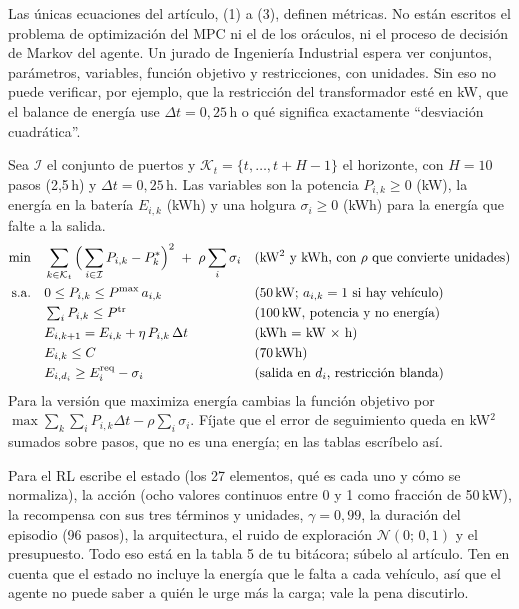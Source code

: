 \documentclass[11pt]{article}
\begin{document}
\begin{error}
Las únicas ecuaciones del artículo, (1) a (3), definen métricas. No están escritos el problema de optimización del MPC ni el de los oráculos, ni el proceso de decisión de Markov del agente. Un jurado de Ingeniería Industrial espera ver conjuntos, parámetros, variables, función objetivo y restricciones, con unidades. Sin eso no puede verificar, por ejemplo, que la restricción del transformador esté en kW, que el balance de energía use $\Delta t = 0{,}25$\,h o qué significa exactamente ``desviación cuadrática''.
\end{error}

\begin{ejemplo}
Sea $\mathcal{I}$ el conjunto de puertos y $\mathcal{K}_t = \{t,\dots,t+H-1\}$ el horizonte, con $H = 10$ pasos (2,5\,h) y $\Delta t = 0{,}25$\,h. Las variables son la potencia $P_{i,k} \ge 0$ (kW), la energía en la batería $E_{i,k}$ (kWh) y una holgura $\sigma_i \ge 0$ (kWh) para la energía que falte a la salida.
\begin{align*}
\min \quad & \sum_{k \in \mathcal{K}_t} \Big(\sum_{i \in \mathcal{I}} P_{i,k} - P^{\ast}_{k}\Big)^{2} \;+\; \rho \sum_{i} \sigma_i
  && \text{(kW$^2$ y kWh, con $\rho$ que convierte unidades)}\\
\text{s.a.} \quad & 0 \le P_{i,k} \le P^{\max}\, a_{i,k} && \text{(50\,kW; $a_{i,k}=1$ si hay vehículo)}\\
& \textstyle\sum_{i} P_{i,k} \le P^{\mathrm{tr}} && \text{(100\,kW, potencia y no energía)}\\
& E_{i,k+1} = E_{i,k} + \eta\, P_{i,k}\, \Delta t && \text{(kWh = kW $\times$ h)}\\
& E_{i,k} \le C && \text{(70\,kWh)}\\
& E_{i,d_i} \ge E^{\mathrm{req}}_i - \sigma_i && \text{(salida en $d_i$, restricción blanda)}
\end{align*}
Para la versión que maximiza energía cambias la función objetivo por $\max \sum_{k}\sum_{i} P_{i,k}\Delta t - \rho\sum_i \sigma_i$. Fíjate que el error de seguimiento queda en kW$^2$ sumados sobre pasos, que no es una energía; en las tablas escríbelo así.
\end{ejemplo}

Para el RL escribe el estado (los 27 elementos, qué es cada uno y cómo se normaliza), la acción (ocho valores continuos entre 0 y 1 como fracción de 50\,kW), la recompensa con sus tres términos y unidades, $\gamma = 0{,}99$, la duración del episodio (96 pasos), la arquitectura, el ruido de exploración $\mathcal{N}(0;\,0{,}1)$ y el presupuesto. Todo eso está en la tabla 5 de tu bitácora; súbelo al artículo. Ten en cuenta que el estado no incluye la energía que le falta a cada vehículo, así que el agente no puede saber a quién le urge más la carga; vale la pena discutirlo.
\end{document}
